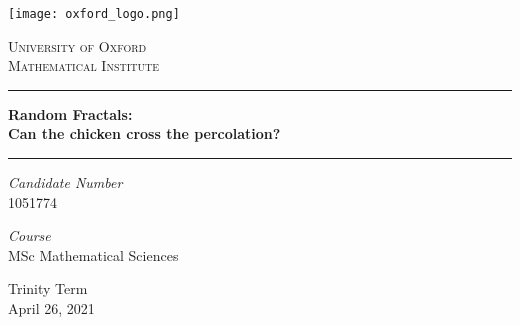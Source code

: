\begin{titlepage}
	\newcommand{\HRule}{\rule{\linewidth}{0.5mm}}
		\begin{center}
		\texttt{[image: oxford\_logo.png]}
		\vspace*{1cm}
		
		\textsc{\LARGE University of Oxford}\\[0.75cm]
		\textsc{\LARGE Mathematical Institute}
		
		\vspace{1.5cm}
		
		\HRule

		\vspace{0.5cm}

		\textbf{\huge Random Fractals:\\}
		\vspace{0.3cm}
		\textbf{\huge Can the chicken cross the percolation?\footnotemark}
		
		\vspace{0.5cm}
		\HRule
		
		\vspace{1.5cm}
		
		\begin{minipage}{0.4\textwidth}
			\begin{flushleft}
				\large
			\end{flushleft}
		\end{minipage}
		
		\begin{minipage}{0.4\textwidth}
			\begin{flushright}
				\large
			\end{flushright}
		\end{minipage}
		
		\vspace{0.5cm}
		
		\textit{Candidate Number}\\
		1051774
		
		\vspace{0.5cm}
		
		\textit{Course}\\
		MSc Mathematical Sciences
		
		\vfill
		
		{\large Trinity Term\\
			April 26, 2021}
	\end{center}
\end{titlepage}
